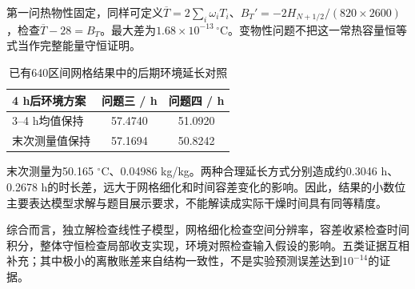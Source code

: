 第一问热物性固定，同样可定义$\overline T=2\sum_i\omega_iT_i$、$B_T'=-2H_{N+1/2}/(820\times2600)$，检查$\overline T-28=B_T$。最大差为$1.68\times10^{-13}\,^\circ$C。变物性问题不把这一常热容量恒等式当作完整能量守恒证明。

\begin{table}[H]\centering
\caption{已有640区间网格结果中的后期环境延长对照}\label{tab:sensitivity}
\begin{tabular}{lcc}
\toprule
4 h后环境方案 & 问题三 / h & 问题四 / h\\\midrule
3--4 h均值保持 & 57.4740 & 51.0920\\
末次测量值保持 & 57.1694 & 50.8242\\
\bottomrule
\end{tabular}
\end{table}
末次测量为50.165 $^\circ$C、0.04986 kg/kg。两种合理延长方式分别造成约0.3046 h、0.2678 h的时长差，远大于网格细化和时间容差变化的影响。因此，结果的小数位主要表达模型求解与题目展示要求，不能解读成实际干燥时间具有同等精度。

综合而言，独立解检查线性子模型，网格细化检查空间分辨率，容差收紧检查时间积分，整体守恒检查局部收支实现，环境对照检查输入假设的影响。五类证据互相补充；其中极小的离散账差来自结构一致性，不是实验预测误差达到$10^{-14}$的证据。
